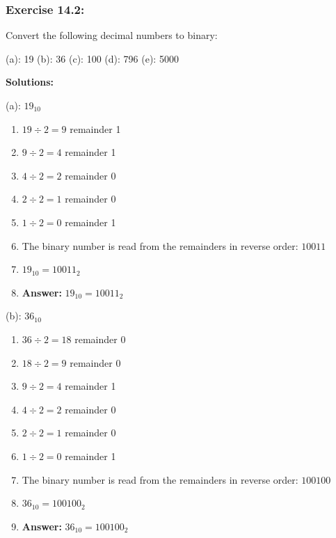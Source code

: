 \documentclass{article}
\begin{document}
\newpage

\subsubsection*{Exercise 14.2:} Convert the following decimal numbers to binary:
\vspace*{0.25cm}

\noindent (a): 19 (b): 36 (c): 100 (d): 796 (e): 5000

\vspace*{0.5cm}

\noindent \textbf{Solutions:}

\vspace*{0.25cm}

\noindent (a): $19_{10}$

\begin{enumerate}
    \item $19 \div 2 = 9$ remainder 1
    \item $9 \div 2 = 4$ remainder 1
    \item $4 \div 2 = 2$ remainder 0
    \item $2 \div 2 = 1$ remainder 0
    \item $1 \div 2 = 0$ remainder 1
    \item The binary number is read from the remainders in reverse order: $10011$
    \item $19_{10} = 10011_2$
    \item \textbf{Answer:} $19_{10} = 10011_2$
\end{enumerate}

\vspace*{0.5cm}

\noindent (b): $36_{10}$

\begin{enumerate}
    \item $36 \div 2 = 18$ remainder 0
    \item $18 \div 2 = 9$ remainder 0
    \item $9 \div 2 = 4$ remainder 1
    \item $4 \div 2 = 2$ remainder 0
    \item $2 \div 2 = 1$ remainder 0
    \item $1 \div 2 = 0$ remainder 1
    \item The binary number is read from the remainders in reverse order: $100100$
    \item $36_{10} = 100100_2$
    \item \textbf{Answer:} $36_{10} = 100100_2$
\end{enumerate}
\end{document}
